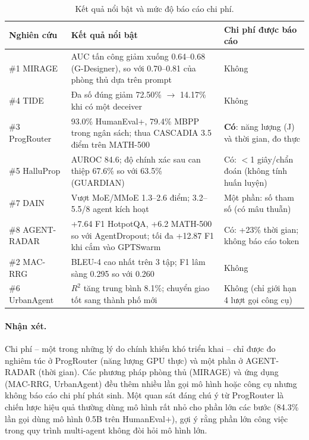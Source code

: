 \begin{table}[!htbp]
\centering
\footnotesize
\caption{Kết quả nổi bật và mức độ báo cáo chi phí.}
\label{tab:cmp-result}
\begin{tabularx}{\textwidth}{L{1.9cm} Y L{3.6cm}}
\toprule
\textbf{Nghiên cứu} & \textbf{Kết quả nổi bật} & \textbf{Chi phí được báo cáo} \\
\midrule
\#1 MIRAGE & AUC tấn công giảm xuống 0.64--0.68 (G-Designer), so với 0.70--0.81 của phòng thủ dựa trên prompt & Không \\
\#4 TIDE & Đa số đúng giảm 72.50\% $\to$ 14.17\% khi có một deceiver & Không \\
\#3 ProgRouter & 93.0\% HumanEval+, 79.4\% MBPP trong ngân sách; thua CASCADIA 3.5 điểm trên MATH-500 & \textbf{Có}: năng lượng (J) và thời gian, đo thực \\
\#5 HalluProp & AUROC 84.6; độ chính xác sau can thiệp 67.6\% so với 63.5\% (GUARDIAN) & Có: $<$1 giây/chẩn đoán (không tính huấn luyện) \\
\#7 DAIN & Vượt MoE/MMoE 1.3--2.6 điểm; 3.2--5.5/8 agent kích hoạt & Một phần: số tham số (có mâu thuẫn) \\
\#8 AGENT-RADAR & +7.64 F1 HotpotQA, +6.2 MATH-500 so với AgentDropout; tối đa +12.87 F1 khi cắm vào GPTSwarm & Có: +23\% thời gian; không báo cáo token \\
\#2 MAC-RRG & BLEU-4 cao nhất trên 3 tập; F1 lâm sàng 0.295 so với 0.260 & Không \\
\#6 UrbanAgent & $R^2$ tăng trung bình 8.1\%; chuyển giao tốt sang thành phố mới & Không (chỉ giới hạn 4 lượt gọi công cụ) \\
\bottomrule
\end{tabularx}
\end{table}

\paragraph{Nhận xét.} Chi phí -- một trong những lý do chính khiến \MAS{} khó triển khai -- chỉ được đo nghiêm túc ở ProgRouter (năng lượng GPU thực) và một phần ở AGENT-RADAR (thời gian). Các phương pháp phòng thủ (MIRAGE) và ứng dụng (MAC-RRG, UrbanAgent) đều thêm nhiều lần gọi mô hình hoặc công cụ nhưng không báo cáo chi phí phát sinh. Một quan sát đáng chú ý từ ProgRouter là chiến lược hiệu quả thường dùng mô hình rất nhỏ cho phần lớn các bước (84.3\% lần gọi dùng mô hình 0.5B trên HumanEval+), gợi ý rằng phần lớn công việc trong quy trình multi-agent không đòi hỏi mô hình lớn.


